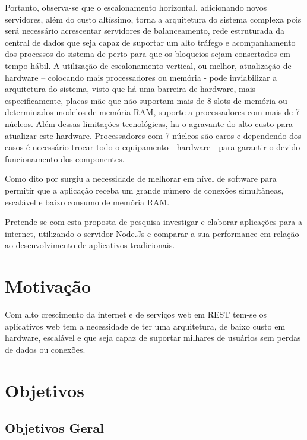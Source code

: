   Portanto, observa-se que o escalonamento horizontal, adicionando novos servidores, além do custo altíssimo, 
  torna a arquitetura do sistema complexa pois será necessário acrescentar servidores de balanceamento, 
  rede estruturada da central de dados que seja capaz de suportar um alto tráfego e acompanhamento dos processos 
  do sistema de perto para que os bloqueios sejam consertados em tempo hábil. A utilização de escalonamento vertical, 
  ou melhor, atualização de hardware – colocando mais processadores ou memória - pode inviabilizar a arquitetura do 
  sistema, visto que há uma barreira de hardware, mais especificamente, placas-mãe que não suportam mais de 8 slots 
  de memória ou determinados modelos de memória RAM, suporte a processadores com mais de 7 núcleos. 
  Além dessas limitações tecnológicas, ha o agravante do alto custo para atualizar este hardware. 
  Processadores com 7 núcleos são caros e dependendo dos casos é necessário trocar todo o equipamento - hardware - 
  para garantir o devido funcionamento dos componentes.
  
  Como dito por \cite{Oliveira:2012} surgiu a necessidade de melhorar em nível de software para permitir que a aplicação
  receba um grande número de conexões simultâneas, escalável e baixo consumo de memória RAM.
  
  Pretende-se com esta proposta de pesquisa investigar e elaborar aplicações para a internet, 
  utilizando o servidor Node.Js e comparar a sua performance em relação ao desenvolvimento
  de aplicativos tradicionais.
  
  
\section{Motivação}
\label{motivacao}
  
  Com alto crescimento da internet e de serviços web em REST tem-se os aplicativos web tem a necessidade de ter
  uma arquitetura, de baixo custo em hardware, escalável e que seja capaz de suportar milhares de usuários 
  sem perdas de dados ou conexões. 
  
\section{Objetivos}
\label{objetivos}

\subsection{Objetivos Geral}

